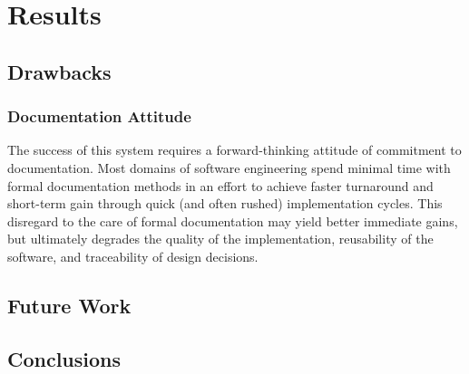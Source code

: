 \section{Results}

\subsection{Drawbacks}

\subsubsection*{Documentation Attitude}
The success of this system requires a forward-thinking attitude of commitment to
documentation. Most domains of software engineering spend minimal time with
formal documentation methods in an effort to achieve faster turnaround and
short-term gain through quick (and often rushed) implementation cycles. This
disregard to the care of formal documentation may yield better immediate gains,
but ultimately degrades the quality of the implementation, reusability of the
software,  and traceability of design decisions.

\subsection{Future Work}

\subsection{Conclusions}